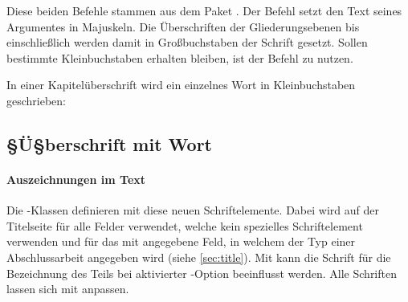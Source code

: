 \begin{Declaration}{}%
\begin{Declaration}{}%
\printdeclarationlist%
%
%
Diese beiden Befehle stammen aus dem Paket . Der Befehl 
 setzt den Text seines Argumentes in Majuskeln. Die 
Überschriften der Gliederungsebenen bis einschließlich  
werden damit in Großbuchstaben der Schrift \DIN gesetzt. Sollen bestimmte 
Kleinbuchstaben erhalten bleiben, ist der Befehl  zu nutzen.
\end{Declaration}
\end{Declaration}
%
\begin{Example}
In einer Kapitelüberschrift wird ein einzelnes Wort in Kleinbuchstaben 
geschrieben:
\begin{Code}[escapechar=§]
\chapter{§Ü§berschrift mit  Wort}
\end{Code}
\end{Example}

\subsubsection{Auszeichnungen im Text}
\begin{Declaration}[v2.02]{}
\begin{Declaration}[v2.02]{}
\begin{Declaration}[v2.02]{}
\printdeclarationlist%
%
Die \TUDScript-Klassen definieren mit  diese neuen 
Schriftelemente. Dabei wird  auf der Titelseite für alle 
Felder verwendet, welche kein spezielles Schriftelement verwenden und 
 für das mit  angegebene Feld, in welchem der Typ 
einer Abschlussarbeit angegeben wird (siehe \autoref{sec:title}). Mit 
 kann die Schrift für die Bezeichnung des Teils bei 
aktivierter -Option beeinflusst werden. Alle Schriften lassen 
sich mit  anpassen.
\end{Declaration}
\end{Declaration}
\end{Declaration}

